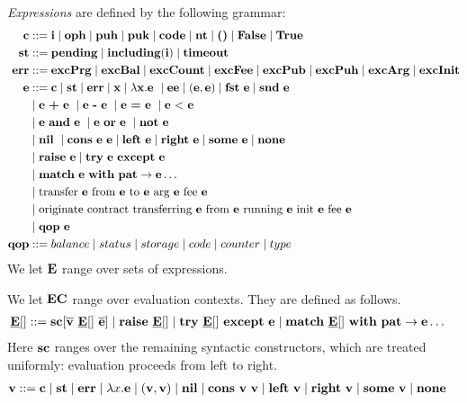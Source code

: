 \documentclass[a4paper]{llncs}
\begin{document}
\begin{definition}%
\emph{Expressions} are defined by the following grammar:
\begin{align*}
  \CONSTANT & ::= \INT %
              \mid \OPH \mid \PUH \mid\PUK \mid \CODE \mid
              \NTEZ \mid \SUNIT \mid \FALSE \mid \TRUE \\
  \STATUS & ::= \STATUSPENDING \mid \STATUSINCLUDING (\INT) \mid
            \STATUSTIMEOUT \\
  \ERROR &::= \ERRPRG \mid \ERRBAL \mid \ERRCOUNT \mid \ERRFEE \mid
           \ERRPUK \mid \ERRPUH \mid \ERRARG \mid \ERRINIT\\
	\EXPR & :: =  \CONSTANT \mid \STATUS \mid \ERROR \mid \VARIABLE \mid \lambda \VARIABLE. \EXPR\ 
	\mid \EXPR\EXPR \mid (\EXPR,\EXPR) \mid \FST\ \EXPR \mid \SND\ \EXPR 	%
	\\&\mid \EXPR\ \PLUS\ \EXPR\ \mid \EXPR\ \MINUS\ \EXPR\ \mid \EXPR\ \EQUAL\ \EXPR\ \mid \EXPR\ \LESS\ \EXPR
	\\&\mid \EXPR\ \AND\ \EXPR\ \mid \EXPR\ \OR\ \EXPR\ \mid \NOT\ \EXPR
  \\&\mid \NIL\ \mid \CONS\ \EXPR\ \EXPR \mid \LEFT\ \EXPR \mid\RIGHT\
  \EXPR \mid \SOME\ \EXPR \mid \NONE
  \\& \mid \RAISE\ \EXPR \mid \TRY\ \EXPR\ \EXCEPT\ \EXPR
  \\& \mid \MATCH\ \EXPR\ \WITH\ \PATTERN\to\EXPR \dots
  \\& \mid \TRANSFER[\EXPR]\EXPR\EXPR\EXPR\EXPR
  \\& \mid \ORIGINATE\EXPR\EXPR\EXPR\EXPR\EXPR
  \\&\mid \QOP\  \EXPR\\
  \QOP & ::= balance \mid status \mid storage \mid code \mid counter \mid type
\end{align*}
We let $\textbf{E}$ range over sets of expressions.

We let $\textbf{EC}$ range over evaluation contexts. They are defined as
follows.
\begin{align*}
  \underline{\textbf{E}}[] & :: = \textbf{sc}[\overline{\textbf{v}}\ \underline{\textbf{E}}[]\ \overline{\textbf{e}}] \mid \textbf{raise}\ \underline{\textbf{E}}[] \mid \textbf{try}\ \underline{\textbf{E}}[]\ \textbf{except}\ \textbf{e}
  \mid \textbf{match}\ \underline{\textbf{E}}[]\ \textbf{with}\ \textbf{pat}\to\textbf{e} \dots
\end{align*}
Here $\textbf{sc}$ ranges over the remaining syntactic constructors, which are
treated uniformly: evaluation proceeds from left to right.
\begin{align*}
  \textbf{v} & ::= \textbf{c} \mid \textbf{st} \mid \textbf{err} \mid \lambda x.\textbf{e} \mid(\textbf{v}, \textbf{v}) \mid
         \textbf{nil} \mid \textbf{cons}\ \textbf{v}\ \textbf{v} \mid \textbf{left}\ \textbf{v} \mid \textbf{right}\
         \textbf{v} \mid \textbf{some}\ \textbf{v}\mid \textbf{none}
\end{align*}
\end{definition}
\end{document}
